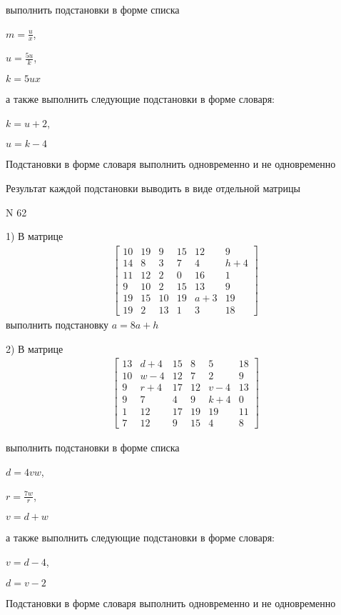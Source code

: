 \documentclass[11pt]{report}
\begin{document}
выполнить подстановки в форме списка

$m=\frac{u}{x}$,

$u=\frac{5 u}{k}$,

$k=5 u x$

а также выполнить следующие подстановки в форме словаря:

$k=u + 2$,

$u=k - 4$


    Подстановки в форме словаря выполнить одновременно и не одновременно


    Результат каждой подстановки выводить в виде отдельной матрицы

\newpage
N 62


    1) В матрице
\begin{align*}
\left[\begin{matrix}10 & 19 & 9 & 15 & 12 & 9\\14 & 8 & 3 & 7 & 4 & h + 4\\11 & 12 & 2 & 0 & 16 & 1\\9 & 10 & 2 & 15 & 13 & 9\\19 & 15 & 10 & 19 & a + 3 & 19\\19 & 2 & 13 & 1 & 3 & 18\end{matrix}\right]
\end{align*}
выполнить подстановку $a=8 a + h$


    2) В матрице
\begin{align*}
\left[\begin{matrix}13 & d + 4 & 15 & 8 & 5 & 18\\10 & w - 4 & 12 & 7 & 2 & 9\\9 & r + 4 & 17 & 12 & v - 4 & 13\\9 & 7 & 4 & 9 & k + 4 & 0\\1 & 12 & 17 & 19 & 19 & 11\\7 & 12 & 9 & 15 & 4 & 8\end{matrix}\right]
\end{align*}

выполнить подстановки в форме списка

$d=4 v w$,

$r=\frac{7 w}{r}$,

$v=d + w$

а также выполнить следующие подстановки в форме словаря:

$v=d - 4$,

$d=v - 2$


    Подстановки в форме словаря выполнить одновременно и не одновременно
\end{document}
